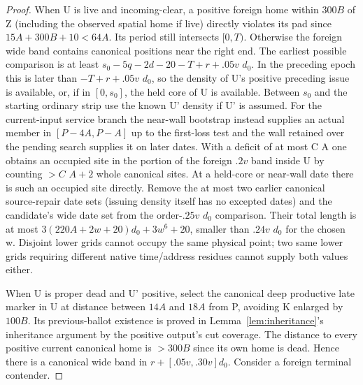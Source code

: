 \begin{proof}
When U is live and incoming-clear, a positive foreign home within \(300B\) of Z (including the observed spatial home if live) directly violates its pad since \(15A+300B+10<64A\). Its period still intersects \([0,T)\). Otherwise the foreign wide band contains canonical positions near the right end. The earliest possible comparison is at least \(s_0- 5q- 2d- 20- T+r+.05v\) \(d_0\). In the preceding epoch this is later than \(- T+r+.05v\) \(d_0\), so the density of U's positive preceding issue is available, or, if in \([0,s_0]\), the held core of U is available. Between \(s_0\) and the starting ordinary strip use the known U' density if U' is assumed. For the current-input service branch the near-wall bootstrap instead supplies an actual member in \([P- 4A,P- A]\) up to the first-loss test and the wall retained over the pending search supplies it on later dates. With a deficit of at most C A one obtains an occupied site in the portion of the foreign \(.2v\) band inside U by counting \(>C\) \(A+2\) whole canonical sites. At a held-core or near-wall date there is such an occupied site directly. Remove the at most two earlier canonical source-repair date sets (issuing density itself has no excepted dates) and the candidate's wide date set from the order-\(.25v\) \(d_0\) comparison. Their total length is at most \(3(220A+2w+20)d_0+3w^6+20\), smaller than \(.24v\) \(d_0\) for the chosen w. Disjoint lower grids cannot occupy the same physical point; two same lower grids requiring different native time/address residues cannot supply both values either.

When U is proper dead and U' positive, select the canonical deep productive late marker in U at distance between \(14A\) and \(18A\) from P, avoiding K enlarged by \(100B\). Its previous-ballot existence is proved in Lemma~\ref{lem:inheritance}'s inheritance argument by the positive output's cut coverage. The distance to every positive current canonical home is \(>300B\) since its own home is dead. Hence there is a canonical wide band in \(r+[.05v,.30v]d_0\). Consider a foreign terminal contender.


\end{proof}

